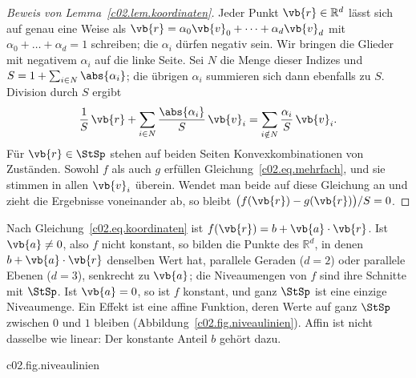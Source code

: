 \begin{vertiefung}
\begin{proof}[Beweis von Lemma~\ref{c02.lem.koordinaten}]
    Jeder Punkt $\vb{r} \in \mathbb{R}^d$ lässt sich auf genau eine Weise als
    $\vb{r} = \alpha_0 \vb{v}_0 + \dots + \alpha_d \vb{v}_d$ mit
    $\alpha_0 + \dots + \alpha_d = 1$ schreiben; die $\alpha_i$ dürfen negativ sein. Wir
    bringen die Glieder mit negativem $\alpha_i$ auf die linke Seite. Sei $N$ die Menge
    dieser Indizes und $S = 1 + \sum_{i \in N} \abs{\alpha_i}$; die übrigen $\alpha_i$
    summieren sich dann ebenfalls zu $S$. Division durch $S$ ergibt
    \begin{equation*}
      \frac{1}{S}\,\vb{r} + \sum_{i \in N} \frac{\abs{\alpha_i}}{S}\,\vb{v}_i
      = \sum_{i \notin N} \frac{\alpha_i}{S}\,\vb{v}_i .
    \end{equation*}
    Für $\vb{r} \in \StSp$ stehen auf beiden Seiten Konvexkombinationen von Zuständen.
    Sowohl $f$ als auch $g$ erfüllen Gleichung~\eqref{c02.eq.mehrfach}, und sie stimmen in
    allen $\vb{v}_i$ überein. Wendet man beide auf diese Gleichung an und zieht die
    Ergebnisse voneinander ab, so bleibt $\bigl(f(\vb{r}) - g(\vb{r})\bigr)/S = 0$.
  \end{proof}
\end{vertiefung}

Nach Gleichung~\eqref{c02.eq.koordinaten} ist $f(\vb{r}) = b + \vb{a}\cdot\vb{r}$. Ist
$\vb{a} \neq 0$, also $f$ nicht konstant, so bilden die Punkte des $\mathbb{R}^d$, in denen
$b + \vb{a}\cdot\vb{r}$ denselben Wert hat, parallele Geraden ($d = 2$) oder parallele
Ebenen ($d = 3$), senkrecht zu $\vb{a}$; die Niveaumengen von $f$ sind ihre Schnitte mit
$\StSp$. Ist $\vb{a} = 0$, so ist $f$ konstant, und ganz $\StSp$ ist eine einzige
Niveaumenge. Ein Effekt ist eine affine Funktion, deren Werte auf ganz
$\StSp$ zwischen $0$ und $1$ bleiben (Abbildung~\ref{c02.fig.niveaulinien}). Affin ist nicht
dasselbe wie linear: Der konstante Anteil $b$ gehört dazu.

\begin{tpcfigure}{c02.fig.niveaulinien}
  \caption{Ein Effekt ist eine affine Funktion mit Werten in $[0,1]$. (a) Auf der Strecke
    ist sein Graph eine Gerade; sie ist durch die Werte $q_0$ und $q_1$ in den Endpunkten
    festgelegt, hier $\tfrac34$ und $\tfrac14$. Im Zustand $x$, der ein Viertel des Weges
    von $s_0$ nach $s_1$ liegt, liest man $f(x) = \tfrac58$ ab. (b) Auf dem Quadrat sind
    die Niveaulinien des Effekts $f(\vb{r}) = \tfrac12 + \tfrac14 r_x + \tfrac14 r_y$
    parallele Geraden senkrecht zu $\vb{a} = (\tfrac14, \tfrac14)$. Der Wert $0$ wird nur
    in der Ecke links unten angenommen, der Wert $1$ nur in der Ecke rechts oben; im
    Zustand $x = (\tfrac12, 0)$ ist $f(x) = \tfrac58$.}
\end{tpcfigure}

